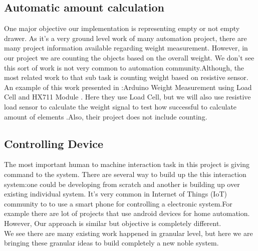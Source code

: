 \subsection{Automatic amount calculation}
One major objective our implementation is representing empty or not empty drawer. As it's a very ground level work of many automation project, there are many project information available regarding weight measurement. However, in our project we are counting the objects based on the overall weight. We don't see this sort of work is not very common to automation community.Although, the most related work to that sub task is counting weight based on resistive sensor. An example of this work presented in \cite{RefWorks:weight_sensor}:Arduino Weight Measurement using Load Cell and HX711 Module \cite{RefWorks:hx711module}. Here they use Load Cell, but we will also use resistive load sensor to calculate the weight signal to test how successful to calculate amount of elements .Also, their project does not include counting.
\subsection{Controlling Device}
The most important human to machine interaction task in this project is giving command to the system. There are several way to build up the this interaction system:one could be developing from scratch and another is building up over existing individual system. It's very common in Internet of Things (IoT) community to to use a smart phone for controlling a electronic system.For example there are lot of projects that use android devices for home automation. However, Our approach is similar but objective is completely different.
\\
We see there are many existing work happened in granular level, but here we are bringing these granular ideas to build completely a new noble system.
